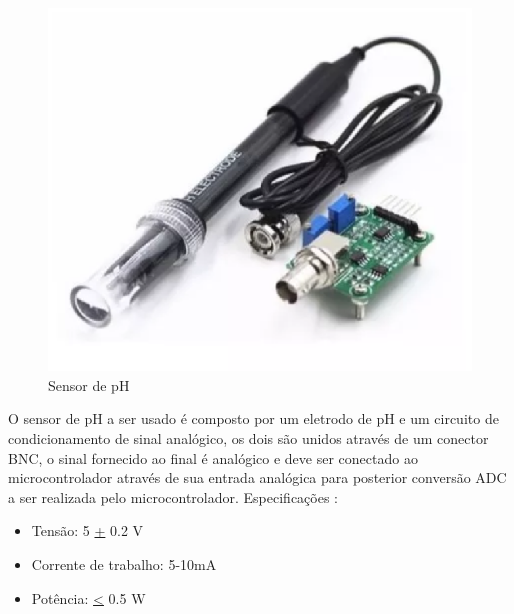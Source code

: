 \begin{figure}[H]
 \centering
   \includegraphics[keepaspectratio=true,scale=0.8]{figuras/sensorph.eps}
 \caption{Sensor de pH}
 \label{sensor_ph}
\end{figure}

O sensor de pH a ser usado é composto por um eletrodo de pH e um circuito de condicionamento de sinal analógico, os dois são unidos através de um conector BNC, o sinal fornecido ao final é analógico e deve ser conectado ao microcontrolador através de sua entrada analógica para posterior conversão ADC a ser realizada pelo microcontrolador. Especificações \cite{mercado2}:
\begin{itemize}
\item Tensão: 5 \underline{+} 0.2 V
\item Corrente de trabalho: 5-10mA
\item Potência: \underline{<} 0.5 W
\end{itemize}


